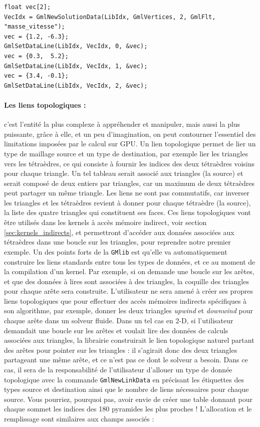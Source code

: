 \documentclass[a4paper,12pt]{article}
\begin{document}
\begin{tt}
\begin{verbatim}
float vec[2];
VecIdx = GmlNewSolutionData(LibIdx, GmlVertices, 2, GmlFlt, "masse_vitesse");
vec = {1.2, -6.3};
GmlSetDataLine(LibIdx, VecIdx, 0, &vec);
vec = {0.3,  5.2};
GmlSetDataLine(LibIdx, VecIdx, 1, &vec);
vec = {3.4, -0.1};
GmlSetDataLine(LibIdx, VecIdx, 2, &vec);
\end{verbatim}
\end{tt}
\normalfont

\paragraph{Les liens topologiques : } c'est l'entité la plus complexe à appréhender et manipuler, mais aussi la plus puissante, grâce à elle, et un peu d'imagination, on peut contourner l'essentiel des limitations imposées par le calcul sur GPU.
Un lien topologique permet de lier un type de maillage source et un type de destination, par exemple lier les triangles vers les tétraèdres, ce qui consiste à fournir les indices des deux tétraèdres voisins pour chaque triangle.
Un tel tableau serait associé aux triangles (la source) et serait composé de deux entiers par triangles, car un maximum de deux tétraèdres peut partager un même triangle.
Les liens ne sont pas commutatifs, car inverser les triangles et les tétraèdres revient à donner pour chaque tétraèdre (la source), la liste des quatre triangles qui constituent ses faces.
Ces liens topologiques vont être utilisés dans les kernels à accès mémoire indirect, voir section \ref{sec:kernels_indirects}, et permettront d'accéder aux données associées aux tétraèdres dans une boucle sur les triangles, pour reprendre notre premier exemple.
Un des points forts de la {\tt GMlib} est qu'elle va automatiquement construire les liens standards entre tous les types de données, et ce au moment de la compilation d'un kernel.
Par exemple, si on demande une boucle sur les arêtes, et que des données à lires sont associées à des triangles, la coquille des triangles pour chaque arête sera construite.
L'utilisateur ne sera amené à créer ses propres liens topologiques que pour effectuer des accès mémoires indirects spécifiques à son algorithme, par exemple, donner les deux triangles \emph{upwind} et \emph{downwind} pour chaque arête dans un solveur fluide.
Dans un tel cas en 2-D, si l'utilisateur demandait une boucle sur les arêtes et voulait lire des données de calculs associées aux triangles, la librairie construirait le lien topologique naturel partant des arêtes pour pointer sur les triangles : il s'agirait donc des deux triangles partageant une même arête, et ce n'est pas ce dont le solveur a besoin.
Dans ce cas, il sera de la responsabilité de l'utilisateur d'allouer un type de donnée topologique avec la commande {\tt GmlNewLinkData} en précisant les étiquettes des types source et destination ainsi que le nombre de liens nécessaires pour chaque source.
Vous pourriez, pourquoi pas, avoir envie de créer une table donnant pour chaque sommet les indices des 180 pyramides les plus proches !
L'allocation et le remplissage sont similaires aux champs associés :
\end{document}

